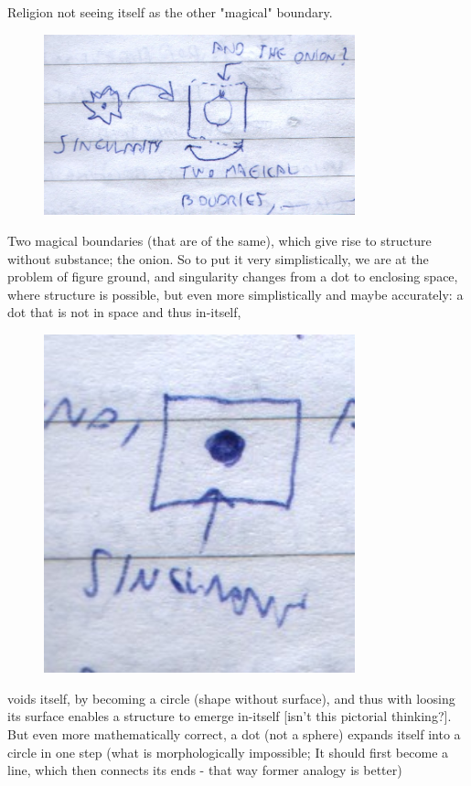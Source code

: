 \documentclass[10pt]{book}
\begin{document}
Religion not seeing itself as the other "magical" boundary. 
\begin{figure}[ht!]
\centering
\includegraphics[width=90mm]{scan03.jpg}
\label{overflow}
\end{figure}
Two magical boundaries (that are of the same), which give rise to structure without substance; the onion.
So to put it very simplistically, we are at the problem of figure ground, and singularity changes from a dot to enclosing space, where structure is possible, but even more simplistically and maybe accurately: a dot that is not in space and thus in-itself, 
\begin{figure}[ht!]
\centering
\includegraphics[width=90mm]{scan04.jpg}
\label{overflow}
\end{figure}
voids itself, by becoming a circle (shape without surface), and thus with loosing its surface enables a structure to emerge in-itself [isn't this pictorial thinking?]. But even more mathematically correct, a dot (not a sphere) expands itself into a circle in one step (what is morphologically impossible; It should first become a line, which then connects its ends - that way former analogy is better)
\end{document}
